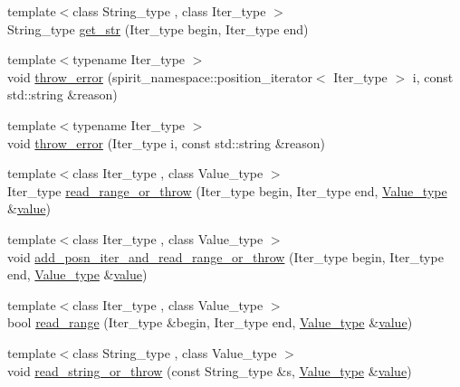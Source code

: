 \begin{DoxyCompactItemize}
\item 
{\footnotesize template$<$class String\+\_\+type , class Iter\+\_\+type $>$ }\\String\+\_\+type \hyperlink{namespacejson__spirit_a1e84f072e0f58bcfed1b02714d1d54ef}{get\+\_\+str} (Iter\+\_\+type begin, Iter\+\_\+type end)
\item 
{\footnotesize template$<$typename Iter\+\_\+type $>$ }\\void \hyperlink{namespacejson__spirit_a64cacddc2cc8e854f25b4447c610f823}{throw\+\_\+error} (spirit\+\_\+namespace\+::position\+\_\+iterator$<$ Iter\+\_\+type $>$ i, const std\+::string \&reason)
\item 
{\footnotesize template$<$typename Iter\+\_\+type $>$ }\\void \hyperlink{namespacejson__spirit_a3887adc0d09e15f2ea0de09543f69ac9}{throw\+\_\+error} (Iter\+\_\+type i, const std\+::string \&reason)
\item 
{\footnotesize template$<$class Iter\+\_\+type , class Value\+\_\+type $>$ }\\Iter\+\_\+type \hyperlink{namespacejson__spirit_a51fe762aa870e8b669cb7fdde4b8d5a1}{read\+\_\+range\+\_\+or\+\_\+throw} (Iter\+\_\+type begin, Iter\+\_\+type end, \hyperlink{namespacejson__spirit_aeaad57c912e0370a76f60cd510ad3d74}{Value\+\_\+type} \&\hyperlink{cache_8cc_a0f61d63b009d0880a89c843bd50d8d76}{value})
\item 
{\footnotesize template$<$class Iter\+\_\+type , class Value\+\_\+type $>$ }\\void \hyperlink{namespacejson__spirit_a32818031cba0001699e93fff14c84523}{add\+\_\+posn\+\_\+iter\+\_\+and\+\_\+read\+\_\+range\+\_\+or\+\_\+throw} (Iter\+\_\+type begin, Iter\+\_\+type end, \hyperlink{namespacejson__spirit_aeaad57c912e0370a76f60cd510ad3d74}{Value\+\_\+type} \&\hyperlink{cache_8cc_a0f61d63b009d0880a89c843bd50d8d76}{value})
\item 
{\footnotesize template$<$class Iter\+\_\+type , class Value\+\_\+type $>$ }\\bool \hyperlink{namespacejson__spirit_a7d872b9b58689ef3797d0b56556a3326}{read\+\_\+range} (Iter\+\_\+type \&begin, Iter\+\_\+type end, \hyperlink{namespacejson__spirit_aeaad57c912e0370a76f60cd510ad3d74}{Value\+\_\+type} \&\hyperlink{cache_8cc_a0f61d63b009d0880a89c843bd50d8d76}{value})
\item 
{\footnotesize template$<$class String\+\_\+type , class Value\+\_\+type $>$ }\\void \hyperlink{namespacejson__spirit_a7c76113cd38b5ca0e5c24024a52116c1}{read\+\_\+string\+\_\+or\+\_\+throw} (const String\+\_\+type \&s, \hyperlink{namespacejson__spirit_aeaad57c912e0370a76f60cd510ad3d74}{Value\+\_\+type} \&\hyperlink{cache_8cc_a0f61d63b009d0880a89c843bd50d8d76}{value})

\end{DoxyCompactItemize}
